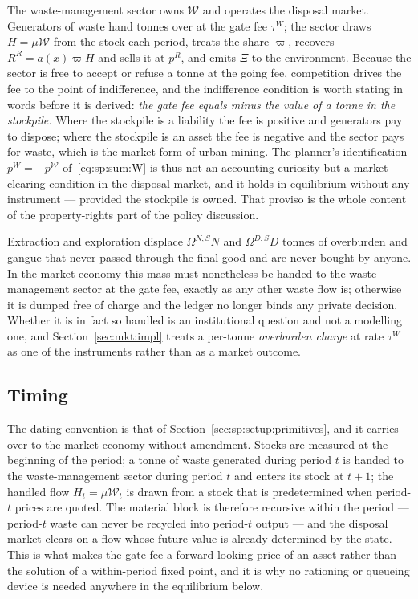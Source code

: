  The waste-management sector owns $\mathcal W$ and operates the disposal market. Generators of waste hand tonnes over at the gate fee $\tau^W$; the sector draws $H=\mu\mathcal W$ from the stock each period, treats the share $\varpi$, recovers $R^R=a\left(x\right)\varpi H$ and sells it at $p^R$, and emits $\Xi$ to the environment. Because the sector is free to accept or refuse a tonne at the going fee, competition drives the fee to the point of indifference, and the indifference condition is worth stating in words before it is derived: \emph{the gate fee equals minus the value of a tonne in the stockpile.} Where the stockpile is a liability the fee is positive and generators pay to dispose; where the stockpile is an asset the fee is negative and the sector pays for waste, which is the market form of urban mining. The planner's identification $p^W=-p^{\mathcal W}$ of~\eqref{eq:sp:sum:W} is thus not an accounting curiosity but a market-clearing condition in the disposal market, and it holds in equilibrium without any instrument --- provided the stockpile is owned. That proviso is the whole content of the property-rights part of the policy discussion.

 Extraction and exploration displace $\Omega^{N,S}N$ and $\Omega^{D,S}D$ tonnes of overburden and gangue that never passed through the final good and are never bought by anyone. In the market economy this mass must nonetheless be handed to the waste-management sector at the gate fee, exactly as any other waste flow is; otherwise it is dumped free of charge and the ledger no longer binds any private decision. Whether it is in fact so handled is an institutional question and not a modelling one, and Section~\ref{sec:mkt:impl} treats a per-tonne \emph{overburden charge} at rate $\tau^W$ as one of the instruments rather than as a market outcome.

\subsection{Timing}\label{sec:mkt:setup:timing}

The dating convention is that of Section~\ref{sec:sp:setup:primitives}, and it carries over to the market economy without amendment. Stocks are measured at the beginning of the period; a tonne of waste generated during period $t$ is handed to the waste-management sector during period $t$ and enters its stock at $t+1$; the handled flow $H_t=\mu\mathcal W_t$ is drawn from a stock that is predetermined when period-$t$ prices are quoted. The material block is therefore recursive within the period --- period-$t$ waste can never be recycled into period-$t$ output --- and the disposal market clears on a flow whose future value is already determined by the state. This is what makes the gate fee a forward-looking price of an asset rather than the solution of a within-period fixed point, and it is why no rationing or queueing device is needed anywhere in the equilibrium below.
